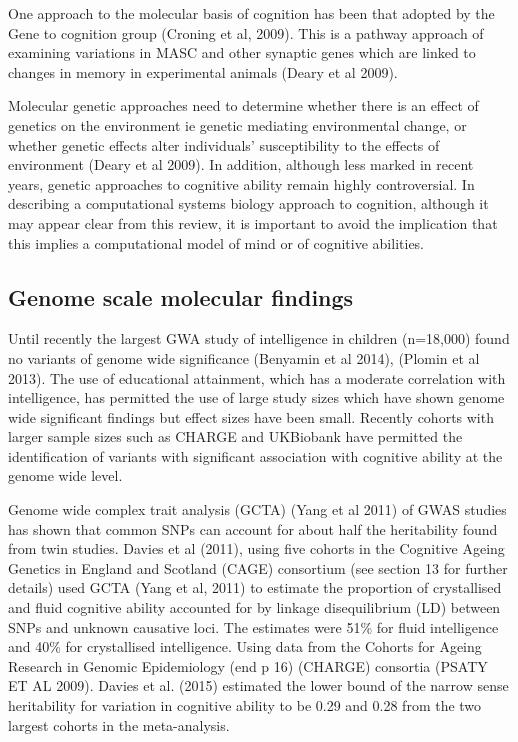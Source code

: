 One approach to the molecular basis of cognition has been that adopted by the Gene to cognition group (Croning et al, 2009).\cite{croning2009g2cdb} This is a pathway approach of examining variations in MASC and other synaptic genes which are linked to changes in memory in experimental animals (Deary et al 2009).\cite{deary2009genetic}

Molecular genetic approaches need to determine whether there is an effect of genetics on the environment ie genetic mediating environmental change, or whether genetic effects alter individuals’ susceptibility to the effects of environment (Deary et al 2009).\cite{deary2009genetic} In addition, although less marked in recent years, genetic approaches to cognitive ability remain highly controversial. In describing a computational systems biology approach to cognition, although it may appear clear from this review, it is important to avoid the implication that this implies a computational model of mind or of cognitive abilities. 

\subsection{Genome scale molecular findings}

Until recently the largest GWA study of intelligence in children (n=18,000) found no variants of genome wide significance (Benyamin et al 2014)\cite{benyamin2014childhood}, (Plomin et al 2013)\cite{plomin2013common}. The use of educational attainment, which has a moderate correlation with intelligence, has permitted the use of large study sizes which have shown genome wide significant findings but effect sizes have been small. Recently cohorts with larger sample sizes such as CHARGE and UKBiobank have permitted the identification of variants with significant association with cognitive ability at the genome wide level. 

Genome wide complex trait analysis (GCTA) (Yang et al 2011)\cite{yang2011gcta} of GWAS studies has shown that common SNPs can account for about half the heritability found from twin studies. Davies et al (2011)\cite{davies2011genome}, using five cohorts in the Cognitive Ageing Genetics in England and Scotland (CAGE) consortium (see section 13 for further details) used GCTA (Yang et al, 2011)\cite{yang2011gcta} to estimate the proportion of crystallised and fluid cognitive ability accounted for by linkage disequilibrium (LD) between SNPs and unknown causative loci. The estimates were 51\% for fluid intelligence and 40\% for crystallised intelligence. Using data from the Cohorts for Ageing Research in Genomic Epidemiology (end p 16) (CHARGE) consortia (PSATY ET AL 2009).\cite{psaty2009cohorts} Davies et al. (2015)\cite{davies2015genetic} estimated the lower bound of the narrow sense heritability for variation in cognitive ability to be 0.29 and 0.28 from the two largest cohorts in the meta-analysis.

